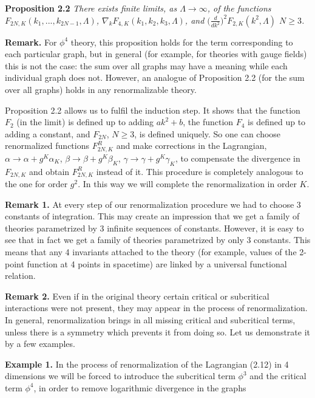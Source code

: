 \documentclass[11pt]{article}
\def\proclaim#1{{\bf #1} \it}
\def\endproclaim{\normalfont}
\def\L{\Lambda}
\begin{document}
\proclaim{Proposition 2.2} There exists finite limits, as $\L\to\infty$, of
the functions $F_{2N,K}(k_1,...,k_{2N-1},\L)$,
$\nabla_kF_{4,K}(k_1,k_2,k_3,\L)$, 
and $\biggl(\frac{d}{dk^2}\biggr)^2F_{2,K}(k^2,\L)$
$N\ge 3$. 
\endproclaim

{\bf Remark.} For $\phi^4$ theory, this proposition holds for 
the term corresponding to each particular graph, but in general
(for example, for theories with gauge fields) this is not the case:
the sum over all graphs may have a meaning while each individual
graph does not. However, an analogue of Proposition 2.2 
(for the sum over all graphs) holds in any renormalizable theory. 

Proposition 2.2 allows us to fulfil the induction step. It shows that
the function $F_2$ (in the limit) is defined up to adding $ak^2+b$, 
the function $F_4$ is defined up to adding a constant, and $F_{2N}$, $N\ge
3$, is defined uniquely. So one can choose renormalized functions
$F_{2N,K}^R$ and make corrections in the Lagrangian,
$\alpha\to\alpha+g^K\alpha_K$, $\beta\to\beta+g^K\beta_K$,
$\gamma\to\gamma+g^K\gamma_K$, to compensate the divergence in $F_{2N,K}$ 
and obtain $F_{2N,K}^R$ instead of it. This procedure is completely
analogous to the one for order $g^2$. In this way we will complete 
the renormalization in order $K$.

{\bf Remark 1.} At every step of our renormalization procedure we 
had to choose 3 constants of integration. This may create an impression
that we get a family of theories parametrized by 3 infinite sequences 
of constants. However, it is easy to see
that in fact we get a family of theories parametrized 
by only 3 constants. This means that any 4 invariants attached to 
the theory (for example, values of the 2-point function at 4 points in 
spacetime) are linked by a universal  
functional relation. 
 
{\bf Remark 2.} Even if in the original theory certain critical
or subcritical interactions were not present, they may appear 
in the process of renormalization. 
In general,
renormalization brings in all missing critical and subcritical
terms, unless there is a symmetry which prevents it from doing so.
Let us demonstrate it by a few examples. 

{\bf Example 1.} 
In the process of 
renormalization of the Lagrangian (2.12) in 4 dimensions we will be forced to 
introduce the subcritical term $\phi^3$ and the critical term
$\phi^4$, in order 
to remove logarithmic divergence in the graphs 
\begin{center} 
 
 
\end{center}
\end{document}
